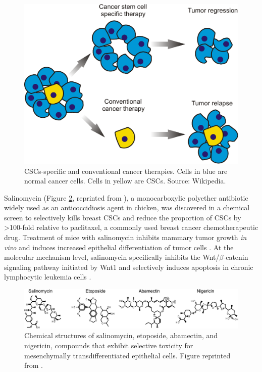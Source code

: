 \begin{figure}
\centering
\includegraphics[width=\linewidth]{Case/CancerStemCell.eps}
\caption{CSCs-specific and conventional cancer therapies. Cells in blue are normal cancer cells. Cells in yellow are CSCs. Source: Wikipedia.}
\label{Case:CancerStemCell}
\end{figure}

Salinomycin (Figure \ref{Case:SalinomycinEtoposideAbamectinNigericin}, reprinted from \citep{1147}), a monocarboxylic polyether antibiotic widely used as an anticoccidiosis agent in chicken, was discovered in a chemical screen to selectively kills breast CSCs and reduce the proportion of CSCs by >100-fold relative to paclitaxel, a commonly used breast cancer chemotherapeutic drug. Treatment of mice with salinomycin inhibits mammary tumor growth \textit{in vivo} and induces increased epithelial differentiation of tumor cells \citep{1147}. At the molecular mechanism level, salinomycin specifically inhibits the Wnt/$\beta$-catenin signaling pathway initiated by Wnt1 and selectively induces apoptosis in chronic lymphocytic leukemia cells \citep{1148}.

\begin{figure}
\centering
\includegraphics[width=\linewidth]{Case/SalinomycinEtoposideAbamectinNigericin.png}
\caption{Chemical structures of salinomycin, etoposide, abamectin, and nigericin, compounds that exhibit selective toxicity for mesenchymally transdifferentiated epithelial cells. Figure reprinted from \citep{1147}.}
\label{Case:SalinomycinEtoposideAbamectinNigericin}
\end{figure}

